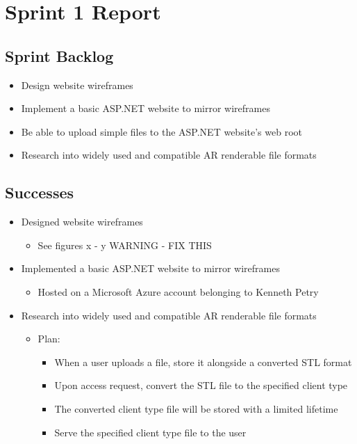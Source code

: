 
\section{Sprint 1 Report}
\label{sec:Sprint1_report}
    \subsection{Sprint Backlog}
    \label{sec:Sprint1_backlog}
    \begin{itemize}
        \item Design website wireframes 
        \item Implement a basic ASP.NET website to mirror wireframes
        \item Be able to upload simple files to the ASP.NET website's web root
        \item Research into widely used and compatible AR renderable file formats
    \end{itemize}

    \subsection{Successes}
    \label{sec:Sprint1_successes}
        \begin{itemize}
            \item Designed website wireframes
                \begin{itemize}
                    \item See figures x - y WARNING - FIX THIS %
                \end{itemize}
            \item Implemented a basic ASP.NET website to mirror wireframes
                \begin{itemize}
                    \item Hosted on a Microsoft Azure account belonging to Kenneth Petry
                \end{itemize}
            \item Research into widely used and compatible AR renderable file formats
                \begin{itemize}
                    \item Plan:
                        \begin{itemize}
                            \item When a user uploads a file, store it alongside a converted STL format
                            \item Upon access request, convert the STL file to the specified client type
                            \item The converted client type file will be stored with a limited lifetime
                            \item Serve the specified client type file to the user
                        \end{itemize}
                \end{itemize}
        \end{itemize}
